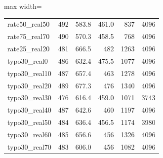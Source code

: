 \documentclass[11pt]{article}
\begin{document}
\begin{table}[H]
\begin{adjustbox}{max width=\textwidth}
\begin{tabular}{lrrrrr}
rate50\_real50 & 492 & 583.8 & 461.0 & 837 & 4096 \\
rate75\_real70 & 490 & 570.3 & 458.5 & 768 & 4096 \\
rate25\_real20 & 481 & 666.5 & 482 & 1263 & 4096 \\
typo30\_real0 & 486 & 632.4 & 475.5 & 1077 & 4096 \\
typo30\_real10 & 487 & 657.4 & 463 & 1278 & 4096 \\
typo30\_real20 & 489 & 677.3 & 476 & 1340 & 4096 \\
typo30\_real30 & 476 & 616.4 & 459.0 & 1071 & 3743 \\
typo30\_real40 & 487 & 642.6 & 460 & 1197 & 4096 \\
typo30\_real50 & 484 & 636.4 & 456.5 & 1174 & 3980 \\
typo30\_real60 & 485 & 656.6 & 456 & 1326 & 4096 \\
typo30\_real70 & 483 & 606.0 & 456 & 1082 & 4096 \\
\bottomrule
\end{tabular}
\end{adjustbox}
\end{table}
\end{document}

